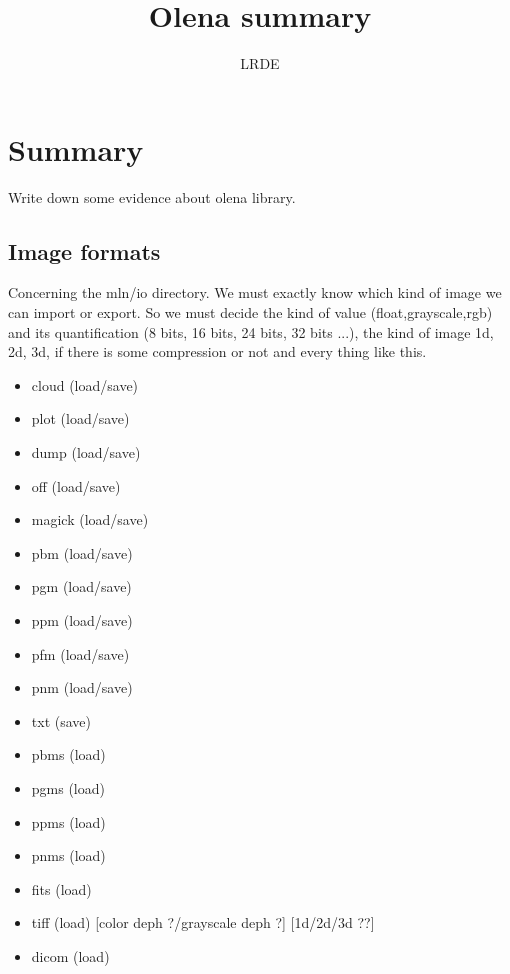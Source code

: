 \documentclass{article}
\title{Olena summary}
\author{LRDE}
\date{}
\begin{document}
\maketitle

\section{Summary}

Write down some evidence about olena library.

\subsection{Image formats}

Concerning the mln/io directory.
We must exactly know which kind of image we can import or export.
So we must decide the kind of value (float,grayscale,rgb) and its 
quantification (8 bits, 16 bits, 24 bits, 32 bits ...), the kind of image
1d, 2d, 3d, if there is some compression or not and every thing like this.

\begin{itemize}
 \item cloud (load/save)
 \item plot (load/save)
 \item dump (load/save)
 \item off (load/save)
 \item magick (load/save)
 \item pbm (load/save)
 \item pgm (load/save)
 \item ppm (load/save)
 \item pfm (load/save)
 \item pnm (load/save)
 \item txt (save)
 \item pbms (load)
 \item pgms (load)
 \item ppms (load)
 \item pnms (load)
 \item fits (load)
 \item tiff (load) [color deph ?/grayscale deph ?] [1d/2d/3d ??]
 \item dicom (load)
\end{itemize}

\end{document}
